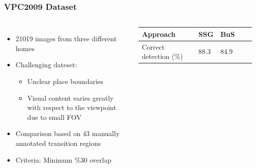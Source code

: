 \frame
{
	\frametitle{VPC2009 Dataset}
	
	\begin{columns}[t,onlytextwidth]
		\hspace*{-1cm}
		
		\vspace{-0.5cm}
		\small
		\begin{itemize}
			\item 21019 images from three different homes
			\item Challenging dateset:
			\begin{itemize}
				\item Unclear place boundaries
				\item Visual content varies
greatly with respect to the viewpoint due to small FOV
			\end{itemize}
			\item Comparison based on 43 manually annotated transition regions
			\item Criteria: Minimum \%30 overlap 
		\end{itemize}
		\centering
		\begin{tabular}{|l|l|l|l|l|}
			\hline
			Approach               & SSG  & BuS  \\ \hline
			Correct detection (\%) & 88.3 & 84.9 \\ \hline
		\end{tabular}
	\end{columns}
}
